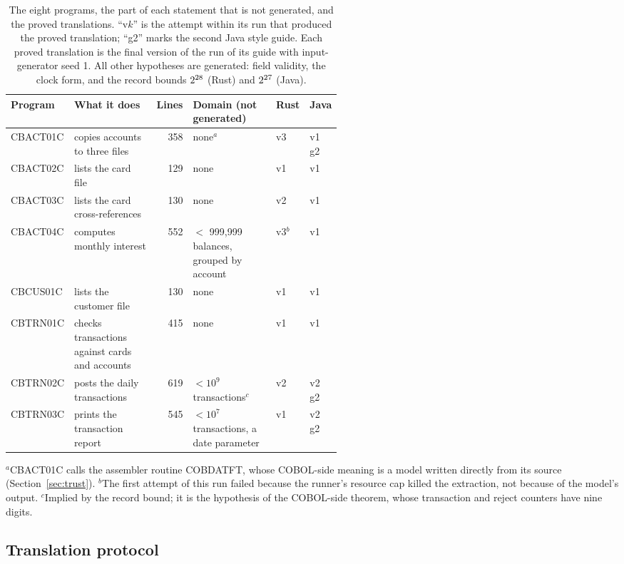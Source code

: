 \begin{table}
\caption{The eight programs, the part of each statement that is not generated, and the proved translations. ``v$k$'' is the
attempt within its run that produced the proved translation; ``g2'' marks the second Java style guide. Each proved
translation is the final version of the run of its guide with input-generator seed 1. All other
hypotheses are generated: field validity, the clock form, and the record bounds $2^{28}$ (Rust) and $2^{27}$
(Java).}
\label{tab:programs}
\footnotesize
\begin{tabular}{@{}lp{0.27\linewidth}rp{0.27\linewidth}ll@{}}
\toprule
Program & What it does & Lines & Domain (not generated) & Rust & Java \\
\midrule
CBACT01C & copies accounts to three files & 358 & none$^{a}$ & v3 & v1 g2 \\
CBACT02C & lists the card file & 129 & none & v1 & v1 \\
CBACT03C & lists the card cross-references & 130 & none & v2 & v1 \\
CBACT04C & computes monthly interest & 552 & $<$ 999,999 balances, grouped by account & v3$^{b}$ & v1 \\
CBCUS01C & lists the customer file & 130 & none & v1 & v1 \\
CBTRN01C & checks transactions against cards and accounts & 415 & none & v1 & v1 \\
CBTRN02C & posts the daily transactions & 619 & $< 10^9$ transactions$^{c}$ & v2 & v2 g2 \\
CBTRN03C & prints the transaction report & 545 & $< 10^7$ transactions, a date parameter & v1 & v2 g2 \\
\bottomrule
\end{tabular}

\smallskip
\footnotesize $^{a}$CBACT01C calls the assembler routine COBDATFT, whose COBOL-side meaning is a model written directly from its source
(Section~\ref{sec:trust}). $^{b}$The first attempt of this run failed because the runner's resource cap killed the
extraction, not because of the model's output. $^{c}$Implied by the record bound; it is the hypothesis of the
COBOL-side theorem, whose transaction and reject counters have nine digits.
\end{table}

\subsection{Translation protocol}
\label{sec:protocol}

